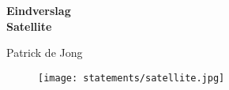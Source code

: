 \begin{titlepage}
    \begin{center}
        \vspace*{1cm}
  
        \huge{\textbf{Eindverslag}} \\ \vspace{0.2cm} \large 
        \large{\textbf{Satellite}} \\
        \vspace{0.2cm}
        \large
		
        Patrick de Jong \\
		\vspace{2cm}
		\begin{figure}[h!]
			\texttt{[image: statements/satellite.jpg]}
		\end{figure}
        \vfill

        \vspace{0.8cm}
    
    \end{center}
 \end{titlepage}
